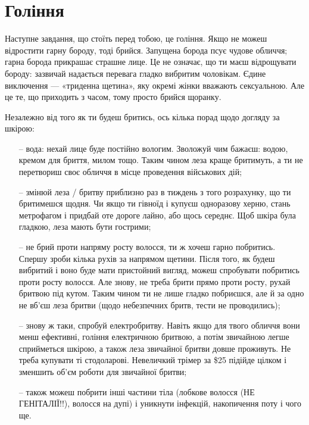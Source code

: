\section{Гоління}
Наступне завдання, що стоїть перед тобою, це гоління. Якщо не можеш відростити
гарну бороду, тоді брийся. Запущена борода псує чудове обличчя; гарна борода
прикрашає страшне лице. Це не означає, що ти маєш відрощувати бороду: зазвичай
надається перевага гладко вибритим чоловікам. Єдине виключення — «триденна
щетина», яку окремі жінки вважають сексуальною. Але це те, що приходить з
часом, тому просто брийся щоранку.

Незалежно від того як ти будеш бритись, ось кілька порад щодо догляду за
шкірою:
\begin{itemize}
	\item[--] вода: нехай лице буде постійно вологим. Зволожуй чим бажаєш:
	водою, кремом для бриття, милом тощо. Таким чином леза краще бритимуть, а
	ти не перетвориш своє обличчя в місце проведення військових дій;
	\item[--] змінюй леза / бритву приблизно раз в тиждень з того розрахунку,
	що ти бритимешся щодня. Чи якщо ти гівноїд і купуєш одноразову херню,
	стань метрофагом і придбай оте дороге лайно, або щось середнє. Щоб шкіра
	була гладкою, леза мають бути гострими;
	\item[--] не брий проти напряму росту волосся, ти ж хочеш гарно побритись.
	Спершу зроби кілька рухів за напрямом щетини. Після того, як будеш вибритий
	і воно буде мати пристойний вигляд, можеш спробувати побритись проти росту
	волосся. Але знову, не треба брити прямо проти росту, рухай бритвою під
	кутом. Таким чином ти не лише гладко побриєшся, але й за одно не вб’єш леза
	бритви (щодо небезпечних бритв, тести не проводились);
	\item[--] знову ж таки, спробуй електробритву. Навіть якщо для твого
	обличчя вони менш ефективні, гоління електричною бритвою, а потім звичайною
	легше сприйметься шкірою, а також леза звичайної бритви довше проживуть.
	Не треба купувати ті стодоларові. Невеличкий трімер за \$25 підійде цілком
	і зменшить об’єм роботи для звичайної бритви;
	\item[--] також можеш побрити інші частини тіла (лобкове волосся (НЕ
	ГЕНІТАЛІЇ!!), волосся на дупі) і уникнути інфекцій, накопичення поту і
	чого ще.
\end{itemize}

